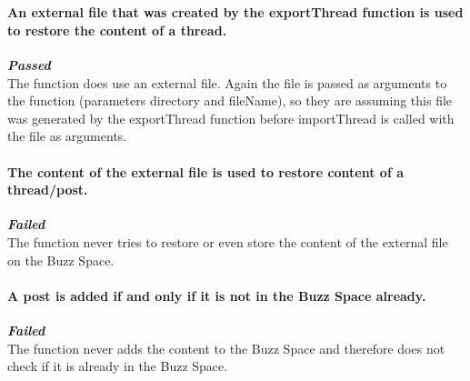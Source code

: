 \paragraph{\color{black}\\An external file that was created by the exportThread function is used to restore the content of a thread.\\}
\color{green}
\textbf{\small \emph{Passed}} \\
\color{black}The function does use an external file. Again the file is passed as arguments to the function (parameters directory and fileName), so they are assuming this file was generated by the exportThread function before importThread is called with the file as arguments.
\par

\paragraph{\color{black}The content of the external file is used to restore content of a thread/post.\\}
\color{red}
\textbf{\small \emph{Failed}} \\
\color{black}The function never tries to restore or even store the content of the external file on the Buzz Space.
\par

\paragraph{\color{black}A post is added if and only if it is not in the Buzz Space already.\\}
\color{red}
\textbf{\small \emph{Failed}} \\
\color{black}The function never adds the content to the Buzz Space and therefore does not check if it is already in the Buzz Space. 
\par

